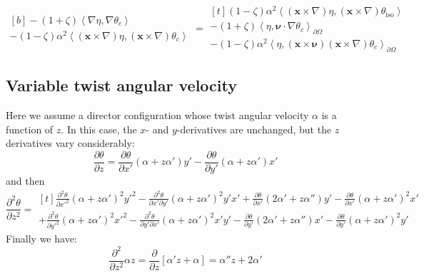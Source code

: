 \documentclass[reqno]{article}
\begin{document}
\begin{equation}
    \begin{multlined}[b]
    -(1 + \zeta) \left<\nabla \eta, \nabla \theta_c \right> \\
    - (1 - \zeta) \alpha^2 \left< \left(\mathbf{x} \times \nabla \right) \eta, \left(\mathbf{x} \times \nabla \right) \theta_c \right>
    \end{multlined}
    =
    \begin{multlined}[t]
    (1 - \zeta) \alpha^2 \left< \left(\mathbf{x} \times \nabla \right)\eta, \left(\mathbf{x} \times \nabla \right) \theta_\text{iso} \right> \\
        - (1 + \zeta) \left<\eta, \boldsymbol{\nu} \cdot \nabla \theta_c \right>_{\partial \Omega} \\
        - (1 - \zeta) \alpha^2 \left< \eta, \left(\mathbf{x} \times \boldsymbol{\nu} \right) \left(\mathbf{x} \times \nabla \right) \theta_c \right>_{\partial \Omega}
    \end{multlined}
\end{equation}

\subsection{Variable twist angular velocity}

Here we assume a director configuration whose twist angular velocity $\alpha$ is a function of $z$.
In this case, the $x$- and $y$-derivatives are unchanged, but the $z$ derivatives vary considerably:
\begin{equation}
    \frac{\partial \theta}{\partial z}
    =
    \frac{\partial \theta}{\partial x'} (\alpha + z\alpha') y'
    -
    \frac{\partial \theta}{\partial y'} (\alpha + z \alpha') x'
\end{equation}
and then
\begin{equation}
    \frac{\partial^2 \theta}{\partial z^2}
    =
    \begin{multlined}[t]
        \frac{\partial^2 \theta}{\partial x'^2} (\alpha + z\alpha')^2 y'^2
        -
        \frac{\partial^2 \theta}{\partial x' \partial y'} (\alpha + z\alpha')^2 y' x'
        +
        \frac{\partial \theta}{\partial x'} (2 \alpha' + z \alpha'') y'
        -
        \frac{\partial \theta}{\partial x'} (\alpha + z\alpha')^2 x' \\
        +
        \frac{\partial^2 \theta}{\partial y'^2} (\alpha + z \alpha')^2 x'^2
        -
        \frac{\partial^2 \theta}{\partial y' \partial x'} (\alpha + z \alpha')^2 x' y'
        -
        \frac{\partial \theta}{\partial y'} (2 \alpha' + z \alpha'') x'
        -
        \frac{\partial \theta}{\partial y'} (\alpha + z \alpha')^2 y'
    \end{multlined}
\end{equation}
Finally we have:
\begin{equation}
    \frac{\partial^2}{\partial z^2} \alpha z
    =
    \frac{\partial}{\partial z} \left[
        \alpha' z + \alpha
    \right]
    =
    \alpha'' z + 2 \alpha'
\end{equation}
\end{document}
